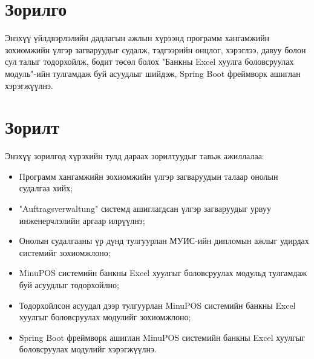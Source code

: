 \section{Зорилго}
	\quad \quad	Энэхүү үйлдвэрлэлийн дадлагын ажлын хүрээнд программ хангамжийн зохиомжийн үлгэр загваруудыг судалж, тэдгээрийн онцлог, хэрэглээ, давуу болон сул талыг тодорхойлж, бодит төсөл болох "Банкны Excel хуулга боловсруулах модуль"-ийн тулгамдаж буй асуудлыг шийдэж, Spring Boot фреймворк ашиглан хэрэгжүүлнэ.

\section{Зорилт}
	\quad \quad	Энэхүү зорилгод хүрэхийн тулд дараах зорилтуудыг тавьж ажиллалаа:
	\begin{itemize}
		\item Программ хангамжийн зохиомжийн үлгэр загваруудын талаар онолын судалгаа хийх;
		\item "Auftragsverwaltung" системд ашиглагдсан үлгэр загваруудыг урвуу инженерчлэлийн аргаар илрүүлнэ;
		\item  Онолын судалгааны үр дүнд тулгуурлан МУИС-ийн дипломын ажлыг удирдах системийг зохиомжлоно;
		\item MinuPOS системийн банкны Excel хуулгыг боловсруулах модульд тулгамдаж буй асуудлыг тодорхойлно;
		\item Тодорхойлсон асуудал дээр тулгуурлан MinuPOS системийн банкны Excel хуулгыг боловсруулах модулийг зохиомжлоно;
		\item Spring Boot фреймворк ашиглан MinuPOS системийн банкны Excel хуулгыг боловсруулах модулийг хэрэгжүүлнэ.
	\end{itemize}
